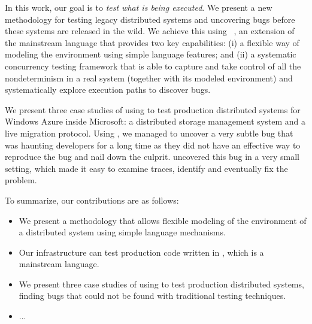 In this work, our goal is to \emph{test what is being executed}. We present a new methodology for testing legacy distributed systems and uncovering bugs before these systems are released in the wild. We achieve this using \psharp~\cite{deligiannis2015psharp}, an extension of the mainstream language \csharp that provides two key capabilities: (i) a flexible way of modeling the environment using simple language features; and (ii) a systematic concurrency testing framework that is able to capture and take control of all the nondeterminism in a real system (together with its modeled environment) and systematically explore execution paths to discover bugs.

We present three case studies of using \psharp to test production distributed systems for Windows Azure inside Microsoft: a distributed storage management system and a live migration protocol. Using \psharp, we managed to uncover a very subtle bug that was haunting developers for a long time as they did not have an effective way to reproduce the bug and nail down the culprit. \psharp uncovered this bug in a very small setting, which made it easy to examine traces, identify and eventually fix the problem.

To summarize, our contributions are as follows:

\begin{itemize}
\item We present a methodology that allows flexible modeling of the environment of a distributed system using simple language mechanisms.
\item Our infrastructure can test production code written in \csharp, which is a mainstream language.
\item We present three case studies of using \psharp to test production distributed systems, finding bugs that could not be found with traditional testing techniques.
\item ...
\end{itemize}
